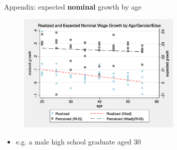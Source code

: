 \documentclass{beamer}
\begin{document}
\begin{frame}{Appendix: expected \textbf{nominal} growth by age}
	\begin{figure}[ht]
		\label{appendix:age_gender_educ_nlevel_compare_figure}
		\centering
		\includegraphics[width=0.7\textwidth]{figures/real_log_wage_gr_nlevel_by_age_edu_gender_compare.png}
	\end{figure}
	\begin{itemize}
		\item e.g. a male high school graduate aged 30 
	\end{itemize}
\end{frame}



\end{document}

